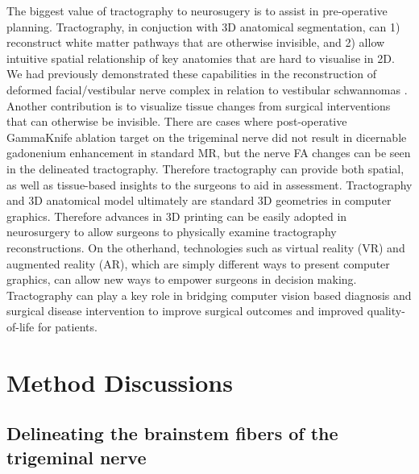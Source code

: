 The biggest value of tractography to neurosugery is to assist in pre-operative planning. Tractography, in conjuction with 3D anatomical segmentation, can 1) reconstruct white matter pathways that are otherwise invisible, and 2) allow intuitive spatial relationship of key anatomies that are hard to visualise in 2D. We had previously demonstrated these capabilities in the reconstruction of deformed facial/vestibular nerve complex in relation to vestibular schwannomas \cite{Chen2011b,Behan2017}.
Another contribution is to visualize tissue changes from surgical interventions that can otherwise be invisible. There are cases where post-operative GammaKnife ablation target on the trigeminal nerve did not result in dicernable gadonenium enhancement in standard MR, but the nerve FA changes can be seen in the delineated tractography. Therefore tractography can provide both spatial, as well as tissue-based insights to the surgeons to aid in assessment.
Tractography and 3D anatomical model ultimately are standard 3D geometries in computer graphics. Therefore advances in 3D printing can be easily adopted in neurosurgery to allow surgeons to physically examine tractography reconstructions. On the otherhand, technologies such as virtual reality (VR) and augmented reality (AR), which are simply different ways to present computer graphics, can allow new ways to empower surgeons in decision making. Tractography can play a key role in bridging computer vision based diagnosis and surgical disease intervention to improve surgical outcomes and improved quality-of-life for patients.    


\section{Method Discussions}

\subsection{Delineating the brainstem fibers of the trigeminal nerve}

